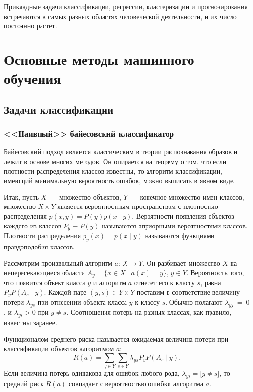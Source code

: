 Прикладные задачи классификации, регрессии, кластеризации и прогнозирования встречаются в самых разных
областях человеческой деятельности, и их число постоянно растет.

\chapter{Основные методы машинного обучения}
\section{Задачи классификации}
\subsection{<<Наивный>> байесовский классификатор}

Байесовский подход является классическим в теории распознавания образов и лежит в основе многих
методов. Он опирается на теорему о том, что если плотности распределения классов известны, то алгоритм
классификации, имеющий минимальную вероятность ошибок, можно выписать в явном виде.

Итак, пусть \( X \)~--- множество объектов, \( Y \)~--- конечное множество имен классов, множество
\( X\times Y \) является вероятностным пространством с плотностью распределения
\( p(x, y) = P(y)p(x\!\mid\!y) \). Вероятности появления объектов каждого из классов \( P_y = P(y) \)
называются априорными вероятностями классов. Плотности распределения \( p_y(x) = p(x\!\mid\!y) \)
называются функциями правдоподобия классов.

Рассмотрим произвольный алгоритм \( a \): \( X\to Y \). Он разбивает множество \( X \) на
непересекающиеся области \( A_y = \bigl\{x\in X\!\mid\! a(x) = y\bigr\} \), \( y\in Y \). Вероятность
того, что появится объект класса \( y \) и алгоритм \( a \) отнесет его к классу \( s \), равна
\( P_y P(A_s\!\mid\!y) \). Каждой паре \( (y, s)\in Y\times Y \) поставим в соответствие величину
потери \( \lambda_{ys} \) при отнесении объекта класса \( y \) к классу \( s \). Обычно полагают
\( \lambda_{yy}~=~0 \), и \( \lambda_{ys} > 0 \) при \( y\ne s \). Соотношения потерь на разных
классах, как правило, известны заранее.

Функционалом среднего риска называется ожидаемая величина потери при классификации объектов алгоритмом
\( a \):
\[
  R(a) = \sum_{y\in Y} \sum_{s\in Y} \lambda_{ys} P_y P(A_s\!\mid\! y).
\]
Если величина потерь одинакова для ошибок любого рода, \( \lambda_{ys} = \bigl[y\ne s\bigr] \), то
средний риск \( R(a) \) совпадает с вероятностью ошибки алгоритма \( a \).

